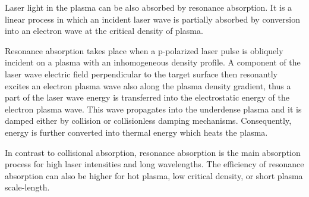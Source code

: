 Laser light in the plasma can be also absorbed by resonance absorption. It is a linear process in which an incident laser wave is partially absorbed by conversion into an electron wave at the critical density of plasma.

Resonance absorption takes place when a p-polarized laser pulse is obliquely incident on a plasma with an inhomogeneous density profile. A component of the laser wave electric field perpendicular to the target surface then resonantly excites an electron plasma wave also along the plasma density gradient, thus a part of the laser wave energy is transferred into the electrostatic energy of the electron plasma wave. This wave propagates into the underdense plasma and it is damped either by collision or collisionless damping mechanisms. Consequently, energy is further converted into thermal energy which heats the plasma.

In contrast to collisional absorption, resonance absorption is the main absorption process for high laser intensities and long wavelengths. The efficiency of resonance absorption can also be higher for hot plasma, low critical density, or short plasma scale-length.
